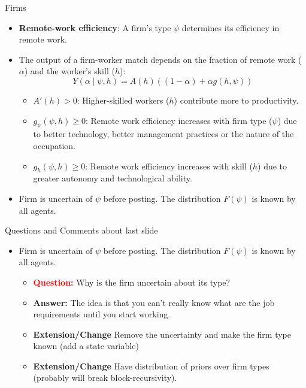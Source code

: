 \documentclass[aspectratio=1610]{beamer}
\begin{document}
\begin{frame}{Firms}
    \begin{itemize}
        \item \textbf{Remote-work efficiency}: A firm’s type $\psi$ determines its efficiency in remote work.  %
        \item The output of a firm-worker match depends on the fraction of remote work ($\alpha$) and the worker's skill ($h$):  $$Y(\alpha \mid \psi, h) = A(h)\left((1 - \alpha) + \alpha g(h,\psi)\right)$$ %
        \begin{itemize}
            \item $A'(h) > 0$: Higher-skilled workers ($h$) contribute more to productivity.
            \item $g_{\psi}(\psi, h) \geq 0$: Remote work efficiency increases with firm type ($\psi$) due to better technology, better management practices or the nature of the occupation.
            \item $g_{h}(\psi, h) \geq 0$: Remote work efficiency increases with skill ($h$) due to greater autonomy and technological ability.
        \end{itemize}%
        \item Firm is uncertain of $\psi$ before posting. The distribution $F(\psi)$ is known by all agents. 
    \end{itemize}
    
\end{frame}

\begin{frame}{Questions and Comments about last slide}
    \begin{itemize}
    \item Firm is uncertain of $\psi$ before posting. The distribution $F(\psi)$ is known by all agents. 
        \pause 
        \begin{itemize}
            \item[]\textcolor{red}{\textbf{Question:}} Why is the firm uncertain about its type? \pause
            \item  \textcolor{mygreen}{\textbf{Answer:}} The idea is that you can't really know what are the job requirements until you start working. \pause 
            \item \textcolor{myorange}{\textbf{Extension/Change}} Remove the uncertainty and make the firm type known (add a state variable) 
            \item \textcolor{myorange}{\textbf{Extension/Change}} Have distribution of priors over firm types (probably will break block-recursivity).  
        \end{itemize}
        
    \end{itemize}
\end{frame}
\end{document}
